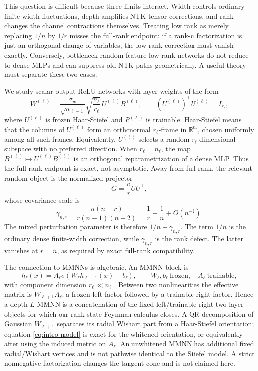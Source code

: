 \documentclass{article}
\newcommand{\R}{\mathbb R}
\begin{document}
This question is difficult because three limits interact. Width controls ordinary finite-width fluctuations, depth amplifies NTK tensor corrections, and rank changes the channel contractions themselves. Treating low rank as merely replacing \(1/n\) by \(1/r\) misses the full-rank endpoint: if a rank-\(n\) factorization is just an orthogonal change of variables, the low-rank correction must vanish exactly. Conversely, bottleneck random-feature low-rank networks do not reduce to dense MLPs and can suppress old NTK paths geometrically. A useful theory must separate these two cases.

We study scalar-output ReLU networks with layer weights of the form
\begin{equation}
W^{(\ell)}=\frac{\sigma_w}{\sqrt{n_{\ell-1}}}\sqrt{\frac{n_\ell}{r_\ell}}\,U^{(\ell)}B^{(\ell)},
\qquad (U^{(\ell)})^\top U^{(\ell)}=I_{r_\ell},
\label{eq:intro-model}
\end{equation}
where \(U^{(\ell)}\) is frozen Haar-Stiefel and \(B^{(\ell)}\) is trainable. Haar-Stiefel means that the columns of \(U^{(\ell)}\) form an orthonormal \(r_\ell\)-frame in \(\R^{n_\ell}\), chosen uniformly among all such frames. Equivalently, \(U^{(\ell)}\) selects a random \(r_\ell\)-dimensional subspace with no preferred direction. When \(r_\ell=n_\ell\), the map \(B^{(\ell)}\mapsto U^{(\ell)}B^{(\ell)}\) is an orthogonal reparametrization of a dense MLP. Thus the full-rank endpoint is exact, not asymptotic. Away from full rank, the relevant random object is the normalized projector
\begin{equation}
G=\frac nr UU^\top,
\label{eq:intro-G}
\end{equation}
whose covariance scale is
\begin{equation}
\gamma_{n,r}=\frac{n(n-r)}{r(n-1)(n+2)}=\frac1r-\frac1n+O(n^{-2}).
\label{eq:intro-gamma}
\end{equation}
The mixed perturbation parameter is therefore \(1/n+\gamma_{n,r}\). The term \(1/n\) is the ordinary dense finite-width correction, while \(\gamma_{n,r}\) is the rank defect. The latter vanishes at \(r=n\), as required by exact full-rank compatibility.

The connection to MMNNs is algebraic.  An MMNN block is
\begin{equation}
h_\ell(x)=A_\ell\sigma(W_\ell h_{\ell-1}(x)+b_\ell),
\qquad W_\ell,b_\ell\ \text{frozen},\quad A_\ell\ \text{trainable},
\label{eq:mmnn-block}
\end{equation}
with component dimension \(r_\ell\ll n_\ell\) \citep{MMNN2024}.  Between two nonlinearities the effective matrix is
\(W_{\ell+1}A_\ell\): a frozen left factor followed by a trainable right factor.  Hence a depth-\(L\) MMNN is a concatenation of the fixed-left/trainable-right two-layer objects for which our rank-state Feynman calculus closes.  A QR decomposition of Gaussian \(W_{\ell+1}\) separates its radial Wishart part from a Haar-Stiefel orientation; equation \eqref{eq:intro-model} is exact for the whitened orientation, or equivalently after using the induced metric on \(A_\ell\).  An unwhitened MMNN has additional fixed radial/Wishart vertices and is not pathwise identical to the Stiefel model.  A strict nonnegative factorization changes the tangent cone and is not claimed here.
\end{document}
